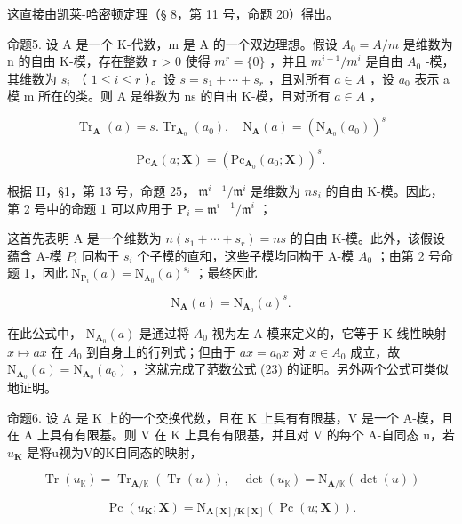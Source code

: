 这直接由凯莱-哈密顿定理（§ 8，第 11 号，命题 20）得出。

命题5. 设 A 是一个 K-代数，m 是 A 的一个双边理想。假设 \(A_{0} = A/m\) 是维数为 n 的自由 K-模，存在整数 r \textgreater{} 0 使得 \(m^{r} = \{0\}\) ，并且 \(m^{i-1}/m^{i}\) 是自由 \(A_{0}\) -模，其维数为 \(s_{i}\) （ \(1 \leqslant i \leqslant r\) ）。设 \(s = s_{1} + \cdots + s_{r}\) ，且对所有 \(a \in A\) ，设 \(a_{0}\) 表示 a 模 m 所在的类。则 A 是维数为 ns 的自由 K-模，且对所有 \(a \in A\) ，

\[
\operatorname{Tr} _ {\mathbf {A}} (a) = s. \operatorname{Tr} _ {\mathbf {A} _ {0}} (a _ {0}), \quad \mathrm{N} _ {\mathbf {A}} (a) = (\mathrm{N} _ {\mathbf {A} _ {0}} (a _ {0})) ^ {s}\tag{23}
\]

\[
\mathrm{Pc} _ {\mathbf {A}} (a; \mathbf {X}) = (\mathrm{Pc} _ {\mathbf {A} _ {0}} (a _ {0}; \mathbf {X})) ^ {s}.
\]

根据 II，§1，第 13 号，命题 25， \(\mathfrak{m}^{i - 1} / \mathfrak{m}^{i}\) 是维数为 \(ns_i\) 的自由 K-模。因此，第 2 号中的命题 1 可以应用于 \(\mathbf{P}_i = \mathfrak{m}^{i - 1} / \mathfrak{m}^{i}\) ；

这首先表明 A 是一个维数为 \(n(s_{1} + \cdots + s_{r}) = ns\) 的自由 K-模。此外，该假设蕴含 A-模 \(P_{i}\) 同构于 \(s_{i}\) 个子模的直和，这些子模均同构于 A-模 \(A_{0}\) ；由第 2 号命题 1，因此 \(\mathrm{N}_{\mathrm{P}_{i}}(a) = \mathrm{N}_{\mathrm{A}_{0}}(a)^{s_{i}}\) ；最终因此

\[
\mathrm{N} _ {\mathbf {A}} (a) = \mathrm{N} _ {\mathbf {A} _ {0}} (a) ^ {s}.
\]

在此公式中， \(\mathrm{N}_{\mathbf{A}_{0}}(a)\) 是通过将 \(A_{0}\) 视为左 A-模来定义的，它等于 K-线性映射 \(x \mapsto ax\) 在 \(A_{0}\) 到自身上的行列式；但由于 \(ax = a_{0}x\) 对 \(x \in A_{0}\) 成立，故 \(\mathrm{N}_{\mathbf{A}_{0}}(a) = \mathrm{N}_{\mathbf{A}_{0}}(a_{0})\) ，这就完成了范数公式 (23) 的证明。另外两个公式可类似地证明。

命题6. 设 A 是 K 上的一个交换代数，且在 K 上具有有限基，V 是一个 A-模，且在 A 上具有有限基。则 V 在 K 上具有有限基，并且对 V 的每个 A-自同态 u，若 \(u_{\mathbf{K}}\) 是将u视为V的K自同态的映射，

\[
\operatorname{Tr} (u _ {\mathbb {K}}) = \operatorname{Tr} _ {\mathbf {A} / \mathbb {K}} (\operatorname{Tr} (u)), \quad \det (u _ {\mathbb {K}}) = \mathrm{N} _ {\mathbf {A} / \mathbb {K}} (\det (u))\tag{24}
\]

\[
\operatorname{Pc} (u _ {\mathbf {K}}; \mathbf {X}) = \mathrm{N} _ {\mathbf {A} [ \mathbf {X} ] / \mathbf {K} [ \mathbf {X} ]} (\operatorname{Pc} (u; \mathbf {X})).
\]


